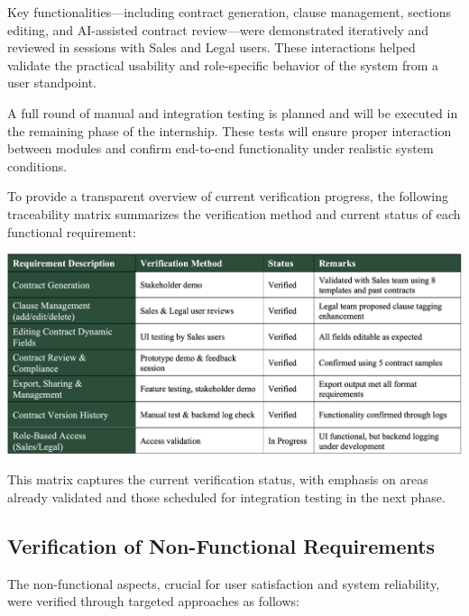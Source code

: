 Key functionalities—including contract generation, clause management, sections editing, and AI-assisted contract review—were demonstrated iteratively and reviewed in sessions with Sales and Legal users. These interactions helped validate the practical usability and role-specific behavior of the system from a user standpoint.\mynewline

A full round of manual and integration testing is planned and will be executed in the remaining phase of the internship. These tests will ensure proper interaction between modules and confirm end-to-end functionality under realistic system conditions.\mynewline

To provide a transparent overview of current verification progress, the following traceability matrix summarizes the verification method and current status of each functional requirement:

\begin{center}
    \centering
    \includegraphics[width=1\textwidth]{Images/Verification of Functional Requirements.png}
    \label{tab:verification_of_functional_requirements}
\end{center}

This matrix captures the current verification status, with emphasis on areas already validated and those scheduled for integration testing in the next phase.

\subsection{Verification of Non-Functional Requirements}
The non-functional aspects, crucial for user satisfaction and system reliability, were verified through targeted approaches as follows:


